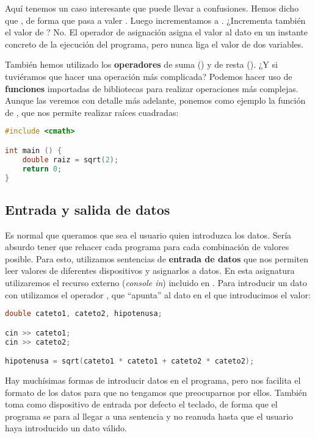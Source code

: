 Aquí tenemos un caso interesante que puede llevar a confusiones.
Hemos dicho que , de forma que  pasa a valer .
Luego incrementamos  a .
¿Incrementa también el valor de ?
No.
El operador de asignación asigna el valor al dato en un instante concreto de la ejecución del programa, pero nunca liga el valor de dos variables.

También hemos utilizado los \textbf{operadores} de suma (\code{+}) y de resta (\code{-}).
¿Y si tuviéramos que hacer una operación más complicada?
Podemos hacer uso de \textbf{funciones} importadas de bibliotecas para realizar operaciones más complejas.
Aunque las veremos con detalle más adelante, ponemos como ejemplo la función  de , que nos permite realizar raíces cuadradas:

\begin{lstlisting}[language=C++]
#include <cmath>

int main () {
	double raiz = sqrt(2);
	return 0;
}
\end{lstlisting}

\subsection{Entrada y salida de datos}

Es normal que queramos que sea el usuario quien introduzca los datos.
Sería absurdo tener que rehacer cada programa para cada combinación de valores posible.
Para esto, utilizamos sentencias de \textbf{entrada de datos} que nos permiten leer valores de diferentes dispositivos y asignarlos a datos.
En esta asignatura utilizaremos el recurso externo  (\textit{console in}) incluido en .
Para introducir un dato con  utilizamos el operador \code{>{}>}, que ``apunta'' al dato en el que introducimos el valor:

\begin{lstlisting}[language=C++]
double cateto1, cateto2, hipotenusa;

cin >> cateto1;
cin >> cateto2;

hipotenusa = sqrt(cateto1 * cateto1 + cateto2 * cateto2);
\end{lstlisting}

Hay muchísimas formas de introducir datos en el programa, pero  nos facilita el formato de los datos para que no tengamos que preocuparnos por ellos.
También toma como dispositivo de entrada por defecto el teclado, de forma que el programa se para al llegar a una sentencia  y no reanuda hasta que el usuario haya introducido un dato válido.

